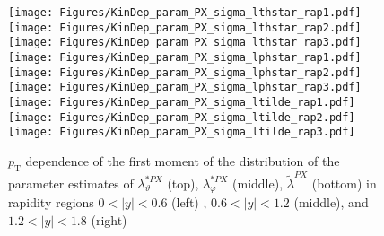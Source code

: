 \documentclass[12pt]{article}
\newcommand{\pT}{p_\mathrm{T}}
\newcommand{\absy}{\left |  y \right |}
\newcommand{\lamtildePX}{\tilde{\lambda}^{\scriptscriptstyle PX}}
\newcommand{\lamthstarPX}{\lambda^{* \scriptscriptstyle PX}_\vartheta}
\newcommand{\lamphstarPX}{\lambda^{* \scriptscriptstyle PX}_\varphi}
\begin{document}
\begin{figure}[htbp]
\centering
\texttt{[image: Figures/KinDep\_param\_PX\_sigma\_lthstar\_rap1.pdf]}
\texttt{[image: Figures/KinDep\_param\_PX\_sigma\_lthstar\_rap2.pdf]}
\texttt{[image: Figures/KinDep\_param\_PX\_sigma\_lthstar\_rap3.pdf]}
\texttt{[image: Figures/KinDep\_param\_PX\_sigma\_lphstar\_rap1.pdf]}
\texttt{[image: Figures/KinDep\_param\_PX\_sigma\_lphstar\_rap2.pdf]}
\texttt{[image: Figures/KinDep\_param\_PX\_sigma\_lphstar\_rap3.pdf]}
\texttt{[image: Figures/KinDep\_param\_PX\_sigma\_ltilde\_rap1.pdf]}
\texttt{[image: Figures/KinDep\_param\_PX\_sigma\_ltilde\_rap2.pdf]}
\texttt{[image: Figures/KinDep\_param\_PX\_sigma\_ltilde\_rap3.pdf]}
\caption{$\pT$ dependence of the first moment of the distribution of the parameter estimates of $\lamthstarPX$ (top), $\lamphstarPX$ (middle), $\lamtildePX$ (bottom) in rapidity regions $0<\absy<0.6$ (left) , $0.6<\absy<1.2$ (middle), and $1.2<\absy<1.8$ (right)}
\end{figure}
\clearpage
\end{document}
